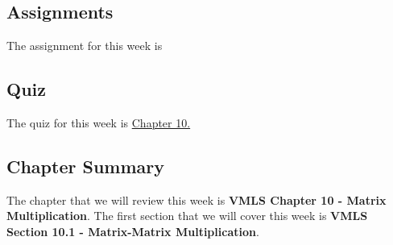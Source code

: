 \subsection{Assignments}

The assignment for this week is   

\subsection{Quiz}

The quiz for this week is \href{https://applied.cs.colorado.edu/mod/quiz/view.php?id=50797}{Chapter 10.}  

\subsection{Chapter Summary}

The chapter that we will review this week is \textbf{VMLS Chapter 10 - Matrix Multiplication}. The first section that we will cover this week is \textbf{VMLS Section 10.1 - Matrix-Matrix Multiplication}.


